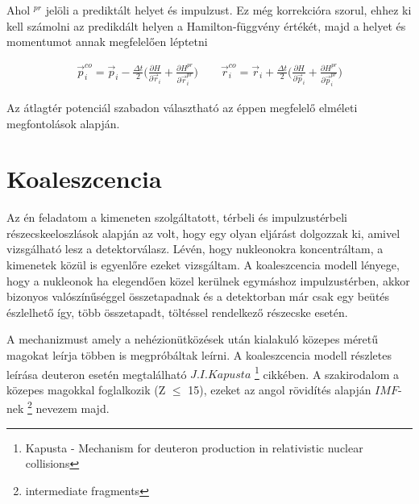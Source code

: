 \documentclass[a4paper,12pt]{article}
\begin{document}
\vspace{5mm}

\par Ahol $^{pr}$ jelöli a prediktált helyet és impulzust. Ez még korrekcióra szorul, ehhez ki kell számolni az predikdált helyen a Hamilton-függvény értékét, majd a helyet és momentumot annak megfelelően léptetni

\vspace{5mm}

\begin{gather}
	\vec{p}^{co}_{i} = \vec{p}_{i} - \frac{\Delta t}{2} \Big(\frac{\partial H}{\partial \vec{r}_{i}} + \frac{\partial H^{pr}}{\partial \vec{r}_{i}^{pr}} \Big) \quad \quad \vec{r}^{co}_{i} = \vec{r}_{i} + \frac{\Delta t}{2} \Big( \frac{\partial H}{\partial \vec{p}_{i}} + \frac{\partial H^{pr}}{\partial \vec{p}_{i}^{pr}} \Big)
\end{gather}

\vspace{5mm}

\par Az átlagtér potenciál szabadon választható az éppen megfelelő elméleti megfontolások alapján.

\section{ Koaleszcencia}

\par Az én feladatom a kimeneten szolgáltatott, térbeli és impulzustérbeli részecskeeloszlások alapján az volt, hogy egy olyan eljárást dolgozzak ki, amivel vizsgálható lesz a detektorválasz. Lévén, hogy nukleonokra koncentráltam, a kimenetek közül is egyenlőre ezeket vizsgáltam. A koaleszcencia modell lényege, hogy a nukleonok ha elegendően közel kerülnek egymáshoz impulzustérben, akkor bizonyos valószínűséggel összetapadnak és a detektorban már csak egy beütés észlelhető így, több összetapadt, töltéssel rendelkező részecske esetén.

\vspace{5mm}

\par A mechanizmust amely a nehézionütközések után kialakuló közepes méretű magokat leírja többen is megpróbáltak leírni. A koaleszcencia modell részletes leírása deuteron esetén megtalálható $J. I. Kapusta$ \footnote{Kapusta - Mechanism for deuteron production in relativistic nuclear collisions} cikkében. A szakirodalom a közepes magokkal foglalkozik (Z $\leq$ 15), ezeket az angol rövidítés alapján $IMF$-nek \footnote{intermediate fragments} nevezem majd. 
\end{document}
